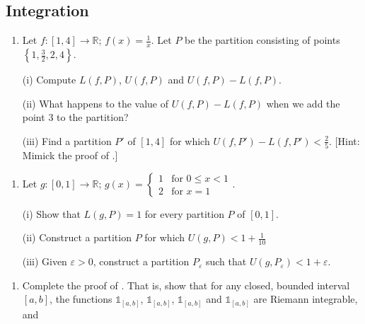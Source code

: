 \documentclass[letterpaper,10pt,english]{jupyterBook}
\begin{document}
\subsection{Integration}
\label{\detokenize{Problems:integration}}\label{\detokenize{Problems:ch6prob}}\label{\detokenize{Problems:id66}}\begin{enumerate}
%
\setcounter{enumi}{65}
\item {} 
\sphinxAtStartPar
Let \(f:[1,4]\to\mathbb{R}\); \(\displaystyle f(x)=\frac{1}{x}\). Let \(P\) be the partition consisting of points \(\left\{1,\frac{3}{2},2,4\right\}\).

\sphinxAtStartPar
(i) Compute \(L(f,P)\), \(U(f,P)\) and \(U(f,P)-L(f,P)\).

\sphinxAtStartPar
(ii) What happens to the value of \(U(f,P)-L(f,P)\) when we add the point \(3\) to the partition?

\sphinxAtStartPar
(iii) Find a partition \(P'\) of \([1,4]\) for which \(U(f,P')-L(f,P')<\frac{2}{5}\). {[}Hint: Mimick the proof of .{]}

\end{enumerate}
\label{\detokenize{Problems:id67}}\begin{enumerate}
%
\setcounter{enumi}{66}
\item {} 
\sphinxAtStartPar
Let \(g:[0,1]\to\mathbb{R}\); \(\displaystyle g(x)=\left\{\begin{array}{cc} 1 & \text{for } 0\leq x<1 \\ 2 &\text{for } x=1 \end{array}\right.\).

\sphinxAtStartPar
(i) Show that \(L(g,P)=1\) for every partition \(P\) of \([0,1]\).

\sphinxAtStartPar
(ii) Construct a partition \(P\) for which \(U(g,P)<1+\frac{1}{10}\)

\sphinxAtStartPar
(iii) Given \(\varepsilon>0\), construct a partition \(P_\varepsilon\) such that \(U(g,P_\varepsilon)<1+\varepsilon\).

\end{enumerate}
\label{\detokenize{Problems:id68}}\begin{enumerate}
%
\setcounter{enumi}{67}
\item {} 
\sphinxAtStartPar
Complete the proof of . That is, show that for any closed, bounded interval \([a,b]\), the functions \(\mathbb{1}_{[a,b]}\), \(\mathbb{1}_{[a,b]}\), \(\mathbb{1}_{[a,b]}\) and \(\mathbb{1}_{[a,b]}\) are Riemann integrable, and

\end{enumerate}
\end{document}
